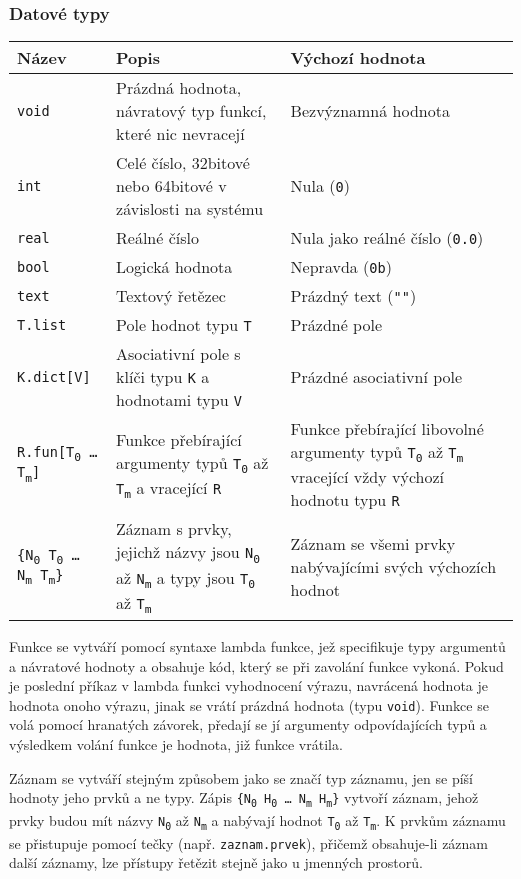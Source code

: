 \documentclass[a4paper,12pt]{article}
\def\quote #1{"#1"}
\begin{document}
\subsubsection{Datové typy}
\begin{tabular}{|m{3.5cm} m{6cm} m{5cm}|}\hline
Název & Popis & Výchozí hodnota \\\hline
\texttt{void} & Prázdná hodnota, návratový typ funkcí, které nic nevracejí & Bezvýznamná hodnota\\\hline
\texttt{int} & Celé číslo, 32bitové nebo 64bitové v závislosti na systému & Nula (\texttt{0})\\\hline
\texttt{real} & Reálné číslo & Nula jako reálné číslo (\texttt{0.0})\\\hline
\texttt{bool} & Logická hodnota & Nepravda (\texttt{0b})\\\hline
\texttt{text} & Textový řetězec & Prázdný text (\texttt{\quote{}})\\\hline
\texttt{T.list} & Pole hodnot typu \texttt{T} & Prázdné pole\\\hline
\texttt{K.dict[V]} & Asociativní pole s klíči typu \texttt{K} a hodnotami typu \texttt{V} & Prázdné asociativní pole\\\hline
\texttt{R.fun[T\textsubscript{0} \ldots{} T\textsubscript{m}]} & Funkce přebírající argumenty typů \texttt{T\textsubscript{0}} až \texttt{T\textsubscript{m}} a vracející \texttt{R} & Funkce přebírající libovolné argumenty typů \texttt{T\textsubscript{0}} až \texttt{T\textsubscript{m}} vracející vždy výchozí hodnotu typu \texttt{R}\\\hline
\texttt{\{N\textsubscript{0} T\textsubscript{0} \ldots{} N\textsubscript{m} T\textsubscript{m}\}} & Záznam s prvky, jejichž názvy jsou \texttt{N\textsubscript{0}} až \texttt{N\textsubscript{m}} a typy jsou \texttt{T\textsubscript{0}} až \texttt{T\textsubscript{m}} & Záznam se všemi prvky nabývajícími svých výchozích hodnot\\\hline
\end{tabular}

Funkce se vytváří pomocí syntaxe lambda funkce, jež specifikuje typy argumentů a návratové hodnoty a obsahuje kód, který se při zavolání funkce vykoná. Pokud je poslední příkaz v lambda funkci vyhodnocení výrazu, navrácená hodnota je hodnota onoho výrazu, jinak se vrátí prázdná hodnota (typu \texttt{void}). Funkce se volá pomocí hranatých závorek, předají se jí argumenty odpovídajících typů a výsledkem volání funkce je hodnota, již funkce vrátila.

Záznam se vytváří stejným způsobem jako se značí typ záznamu, jen se píší hodnoty jeho prvků a ne typy. Zápis \texttt{\{N\textsubscript{0} H\textsubscript{0} \ldots{} N\textsubscript{m} H\textsubscript{m}\}} vytvoří záznam, jehož prvky budou mít názvy \texttt{N\textsubscript{0}} až \texttt{N\textsubscript{m}} a nabývají hodnot \texttt{T\textsubscript{0}} až \texttt{T\textsubscript{m}}. K prvkům záznamu se přistupuje pomocí tečky (např. \texttt{zaznam.prvek}), přičemž obsahuje-li záznam další záznamy, lze přístupy řetězit stejně jako u jmenných prostorů.
\end{document}
